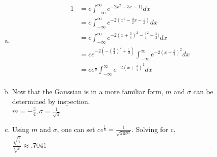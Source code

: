 \documentclass[12pt]{article}
\newenvironment{problem}[2][Problem]{\begin{trivlist}
\item[\hskip \labelsep {\bfseries #1}\hskip \labelsep {\bfseries #2.}]
  \vspace{1 cm}
}{\end{trivlist}}
\begin{document}
\begin{problem}{3.21}
\item
  \begin{enumerate}[a.]
    \item %
      \begin{align*}
        1 &= c \int_{-\infty}^{\infty} e^{-2x^2 -3x-1)}dx \\
        &= c \int_{-\infty}^{\infty} e^{-2(x^2 -\frac{3}{2}x-\frac{1}{2})}dx \\
        &= c \int_{-\infty}^{\infty} e^{-2(x +\frac{3}{4})^2-\frac{3}{4}^2+\frac{1}{2})}dx \\
        &= ce^{-2\left(-(\frac{3}{4})^2+\frac{1}{2}\right)} \int_{-\infty}^{\infty} e^{-2(x +\frac{3}{4})^2}dx \\
        &= ce^{\frac{1}{8}} \int_{-\infty}^{\infty} e^{-2(x +\frac{3}{4})^2}dx \\
      \end{align*}
    \item %
      Now that the Gaussian is in a more familiar form, $m$ and $\sigma$ can be
      determined by inspection. \\
      $m = -\frac{3}{4}, \sigma = \frac{1}{\sqrt{4}}$
    \item %
      Using $m$ and $\sigma$, one can set $ce^{\frac{1}{8}}= \frac{1}{\sqrt{2\pi\sigma^2}}$.
      Solving for c,\\
      $\frac{\sqrt{\frac{2}{\pi}}}{\sqrt[8]{e}} \approx .7041$
  \end{enumerate}
\end{problem}
\end{document}
